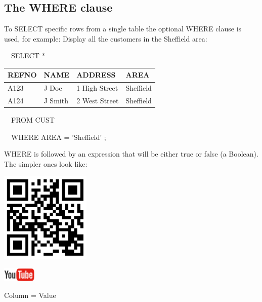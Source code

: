 \subsection{The WHERE clause}
To SELECT specific rows from a single table the optional WHERE clause is used, for example:  Display all the customers in the Sheffield area:

\ \ SELECT *

\begin{center}
\begin{minipage}{9.192cm}
\begin{flushleft}
\tablefirsthead{}
\tablehead{}
\tabletail{}
\tablelasttail{}
\begin{supertabular}{|m{1.742cm}|m{1.798cm}|m{2.8cm}|m{2.049cm}|}
\hline
REFNO &
NAME &
ADDRESS &
AREA\\\hline
A123 &
J Doe &
1 High Street &
Sheffield\\
A124 &
J Smith &
2 West Street &
Sheffield\\
\end{supertabular}
\end{flushleft}
\end{minipage}
\end{center}
\ \ FROM CUST 

\ \ WHERE AREA = 'Sheffield' ;

WHERE is followed by an expression that will be either true or false (a Boolean). The simpler ones look like:

\begin{center}
\begin{minipage}{4.849cm}
   
\includegraphics[width=4.314cm,height=4.314cm]{images/img (24).png}
 

   
\includegraphics[width=1.582cm,height=0.674cm]{images/img (15).png}
 
\end{minipage}
\end{center}
Column  = Value

